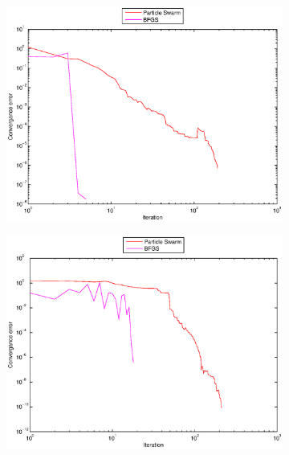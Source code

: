 \documentclass[12pt,parskip=full]{article}
\numberwithin{subsection}{section}
\begin{document}
		\begin{figure}[!ht]
			\centering
			\begin{subfigure}[h]{0.45\textwidth}
				\includegraphics[width=\textwidth]{ParticleSwarmDragError2.eps}
			\end{subfigure}
			\begin{subfigure}[h]{0.45\textwidth}
				\includegraphics[width=\textwidth]{ParticleSwarmRose2DError.eps}
			\end{subfigure}
			\begin{subfigure}[h]{0.45\textwidth}

\end{subfigure}
\end{figure}
\end{document}
